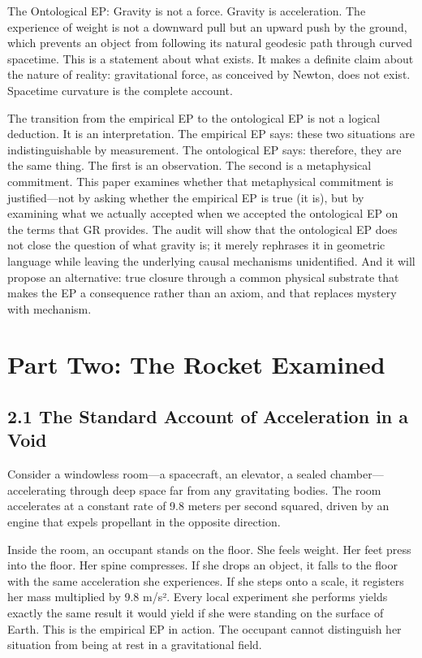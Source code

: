\documentclass[11pt]{article}
\begin{document}
The Ontological EP: Gravity is not a force. Gravity is acceleration. The experience of weight is not a downward pull but an upward push by the ground, which prevents an object from following its natural geodesic path through curved spacetime. This is a statement about what exists. It makes a definite claim about the nature of reality: gravitational force, as conceived by Newton, does not exist. Spacetime curvature is the complete account.

The transition from the empirical EP to the ontological EP is not a logical deduction. It is an interpretation. The empirical EP says: these two situations are indistinguishable by measurement. The ontological EP says: therefore, they are the same thing. The first is an observation. The second is a metaphysical commitment. This paper examines whether that metaphysical commitment is justified---not by asking whether the empirical EP is true (it is), but by examining what we actually accepted when we accepted the ontological EP on the terms that GR provides. The audit will show that the ontological EP does not close the question of what gravity is; it merely rephrases it in geometric language while leaving the underlying causal mechanisms unidentified. And it will propose an alternative: true closure through a common physical substrate that makes the EP a consequence rather than an axiom, and that replaces mystery with mechanism.

\section{Part Two: The Rocket Examined}

\subsection{2.1 The Standard Account of Acceleration in a Void}

Consider a windowless room---a spacecraft, an elevator, a sealed chamber---accelerating through deep space far from any gravitating bodies. The room accelerates at a constant rate of 9.8 meters per second squared, driven by an engine that expels propellant in the opposite direction.

Inside the room, an occupant stands on the floor. She feels weight. Her feet press into the floor. Her spine compresses. If she drops an object, it falls to the floor with the same acceleration she experiences. If she steps onto a scale, it registers her mass multiplied by 9.8 m/s². Every local experiment she performs yields exactly the same result it would yield if she were standing on the surface of Earth. This is the empirical EP in action. The occupant cannot distinguish her situation from being at rest in a gravitational field.
\end{document}
